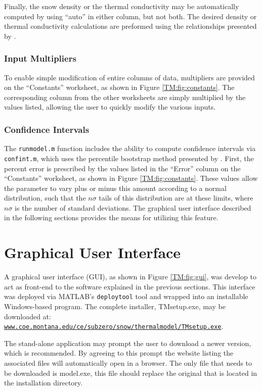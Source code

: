 Finally, the snow density or the thermal conductivity may be automatically computed by using ``auto'' in either column, but not both.  The desired density or thermal conductivity calculations are preformed using the relationships presented by \citet{sturm1997}.

\subsubsection{Input Multipliers}
To enable simple modification of entire columns of data, multipliers are provided on the ``Constants'' worksheet, as shown in Figure \ref{TM:fig:constants}.  The corresponding column from the other worksheets are simply multiplied by the values listed, allowing the user to quickly modify the various inputs.

\subsubsection{Confidence Intervals}\label{TM:sec:conf} The \texttt{runmodel.m} function includes the ability to compute confidence intervals via \texttt{confint.m}, which uses the percentile bootstrap method presented by \citet{efron1993}.  First, the percent error is prescribed by the values listed in the ``Error'' column on the ``Constants'' worksheet, as shown in Figure \ref{TM:fig:constants}.  These values allow the parameter to vary plus or minus this amount according to a normal distribution, such that the $n\sigma$ tails of this distribution are at these limits, where $n\sigma$ is the number of standard deviations.  The graphical user interface described in the following sections provides the means for utilizing this feature.

\section{Graphical User Interface}\label{TM:sec:gui}
A graphical user interface (GUI), as shown in Figure \ref{TM:fig:gui}, was develop to act as front-end to the software explained in the previous sections. This interface was deployed via MATLAB's \texttt{deploytool} tool and wrapped into an installable Windows-based program.  The complete installer, TMsetup.exe, may be downloaded at: \href{http://www.coe.montana.edu/ce/subzero/snow/thermalmodel/TMsetup.exe}{\nolinkurl{www.coe.montana.edu/ce/subzero/snow/thermalmodel/TMsetup.exe}}.

The stand-alone application may prompt the user to download a newer version, which is recommended.  By agreeing to this prompt the website listing the associated files will automatically open in a browser.  The only file that needs to be downloaded is model.exe, this file should replace the original that is located in the installation directory.

